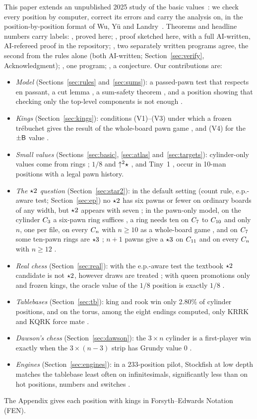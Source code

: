 This paper extends an unpublished 2025 study of the basic values\bytheauthor~\cite{Study2025}: we check
every position by computer, correct its errors and carry the analysis on, in the position-by-position format
of Wu, Y\"u and Landry~\cite{WuYuLandry2010}. Theorems and headline numbers
carry labels: , proved here; , proof sketched here, with a full AI-written, AI-refereed proof in the
repository; , two separately written programs agree,
the second from the rules alone (both AI-written; Section~\ref{sec:verify}, Acknowledgment); , one program; , a conjecture. Our contributions
are:
\begin{itemize}
\item \emph{Model} (Sections~\ref{sec:rules} and~\ref{sec:sums}): a passed-pawn test that respects en passant,
  a cut lemma , a sum-safety theorem , and a position showing that checking only the
  top-level components is not enough .
\item \emph{Kings} (Section~\ref{sec:kings}): conditions (V1)--(V3) under which a frozen tr\'ebuchet gives the
  result of the whole-board pawn game , and (V4) for the $\pm\mathsf{B}$ value .
\item \emph{Small values} (Sections~\ref{sec:basic}, \ref{sec:atlas} and~\ref{sec:targets}): cylinder-only values
  come from rings ; $1/8$ and $\mathord{\uparrow^{2}}\star$ , and Tiny~1 , occur in 10-man positions
  with a legal pawn history.
\item \emph{The $\mathord{\star2}$ question} (Section~\ref{sec:star2}): in the default setting (count rule, e.p.-aware
  test; Section~\ref{sec:ep}) no $\mathord{\star2}$ has six
  pawns or fewer on ordinary boards of any width, but $\mathord{\star2}$ appears with seven
  ; in the pawn-only model, on the cylinder $C_{3}$ a six-pawn ring suffices , a ring needs ten on $C_{7}$ to $C_{10}$
   and only $n$, one per file, on every $C_{n}$ with $n\ge10$ as a whole-board game , and on $C_{7}$ some ten-pawn
  rings are $\mathord{\star3}$ ; $n+1$ pawns give a $\mathord{\star3}$ on $C_{11}$  and on every $C_{n}$ with $n\ge12$ .
\item \emph{Real chess} (Section~\ref{sec:real}): with the e.p.-aware test the textbook $\mathord{\star2}$ candidate is not
  $\mathord{\star2}$, however draws are treated ; with queen promotions only and frozen kings, the oracle value of the $1/8$ position
  is exactly $1/8$ .
\item \emph{Tablebases} (Section~\ref{sec:tb}): king and rook win only 2.80\% of cylinder positions, and on the
  torus, among the eight endings computed, only KRRK and KQRK force mate .
\item \emph{Dawson's chess} (Section~\ref{sec:dawson}): the $3\times n$ cylinder is a first-player win exactly
  when the $3\times(n-3)$ strip has Grundy value $0$ .
\item \emph{Engines} (Section~\ref{sec:engines}): in a $233$-position pilot, Stockfish at low depth matches the tablebase least often on infinitesimals, significantly less than on hot positions, numbers and switches .
\end{itemize}

The Appendix gives each position with kings in Forsyth--Edwards Notation (FEN).
